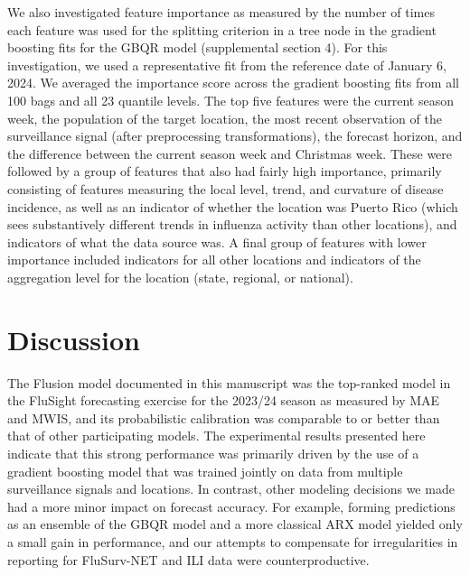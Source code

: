\documentclass{article}\usepackage[]{graphicx}\usepackage[]{xcolor}
\begin{document}
We also investigated feature importance as measured by the number of times each feature was used for the splitting criterion in a tree node in the gradient boosting fits for the GBQR model (supplemental section 4). For this investigation, we used a representative fit from the reference date of January 6, 2024. We averaged the importance score across the gradient boosting fits from all 100 bags and all 23 quantile levels.  The top five features were the current season week, the population of the target location, the most recent observation of the surveillance signal (after preprocessing transformations), the forecast horizon, and the difference between the current season week and Christmas week.  These were followed by a group of features that also had fairly high importance, primarily consisting of features measuring the local level, trend, and curvature of disease incidence, as well as an indicator of whether the location was Puerto Rico (which sees substantively different trends in influenza activity than other locations), and indicators of what the data source was. A final group of features with lower importance included indicators for all other locations and indicators of the aggregation level for the location (state, regional, or national).

\section{Discussion}
\label{sec:discussion}

The Flusion model documented in this manuscript was the top-ranked model in the FluSight forecasting exercise for the 2023/24 season as measured by MAE and MWIS, and its probabilistic calibration was comparable to or better than that of other participating models. The experimental results presented here indicate that this strong performance was primarily driven by the use of a gradient boosting model that was trained jointly on data from multiple surveillance signals and locations. In contrast, other modeling decisions we made had a more minor impact on forecast accuracy. For example, forming predictions as an ensemble of the GBQR model and a more classical ARX model yielded only a small gain in performance, and our attempts to compensate for irregularities in reporting for FluSurv-NET and ILI data were counterproductive.
\end{document}
